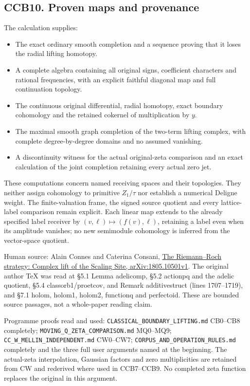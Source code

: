\subsection{CCB10. Proven maps and
provenance}\label{ccb10.-proven-maps-and-provenance}

The calculation supplies:

\begin{itemize}
\tightlist
\item
  The exact ordinary smooth completion and a sequence proving that it
  loses the radial lifting homotopy.
\item
  A complete algebra containing all original signs, coefficient
  characters and rational frequencies, with an explicit faithful
  diagonal map and full continuation topology.
\item
  The continuous original differential, radial homotopy, exact boundary
  cohomology and the retained cokernel of multiplication by \(y\).
\item
  The maximal smooth graph completion of the two-term lifting complex,
  with complete degree-by-degree domains and no assumed vanishing.
\item
  A discontinuity witness for the actual original-zeta comparison and an
  exact calculation of the joint completion retaining every actual zero
  jet.
\end{itemize}

These computations concern named receiving spaces and their topologies.
They neither assign cohomology to primitive \(Z_1/\tau\) nor establish a
numerical Deligne weight. The finite-valuation frame, the signed source
quotient and every lattice-label comparison remain explicit. Each linear
map extends to the already specified label receiver by
\((v,\ell)\mapsto(f(v),\ell)\), retaining a label even when its
amplitude vanishes; no new semimodule cohomology is inferred from the
vector-space quotient.

Human source: Alain Connes and Caterina Consani,
\href{https://arxiv.org/abs/1805.10501v1}{The Riemann--Roch strategy:
Complex lift of the Scaling Site, arXiv:1805.10501v1}. The original
author TeX was read at §5.1 Lemma adelicomp, §5.2 actionpq and the
adelic quotient, §5.4 classorb1/proetcov, and Remark additivestruct
(lines 1707--1719), and §7.1 holom, holom1, holom2, functionq and
perfectoid. These are bounded source passages, not a whole-paper reading
claim.

Programme proofs read and used: \nolinkurl{CLASSICAL_BOUNDARY_LIFTING.md} CB0--CB8
completely; \nolinkurl{MOVING_Q_ZETA_COMPARISON.md} MQ0--MQ9;
\nolinkurl{CC_W_MELLIN_INDEPENDENT.md} CW0--CW7; \nolinkurl{CORPUS_AND_OPERATION_RULES.md}
completely and the three full user arguments named at the beginning. The
actual-zeta interpolation, Gaussian factors and zero multiplicities are
retained from CW and rederived where used in CCB7--CCB9. No completed
zeta function replaces the original in this argument.

